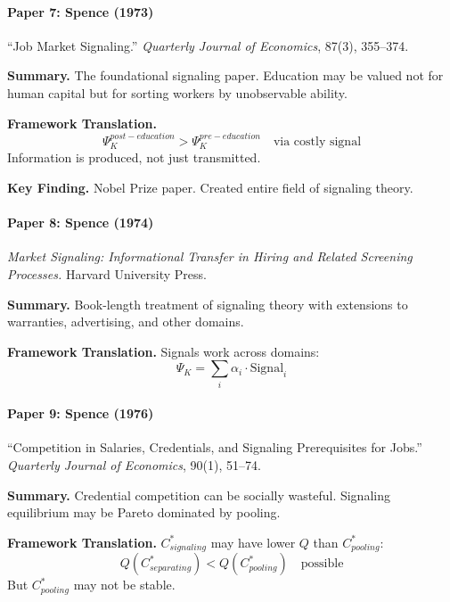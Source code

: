\paragraph{Paper 7: Spence (1973)}

``Job Market Signaling.''
\textit{Quarterly Journal of Economics}, 87(3), 355--374.

\textbf{Summary.}
The foundational signaling paper. Education may be valued not for human 
capital but for sorting workers by unobservable ability.

\textbf{Framework Translation.}
\begin{equation}
\Psi_K^{post-education} > \Psi_K^{pre-education} \quad \text{via costly signal}
\end{equation}
Information is produced, not just transmitted.

\textbf{Key Finding.}
Nobel Prize paper. Created entire field of signaling theory.

\paragraph{Paper 8: Spence (1974)}

\textit{Market Signaling: Informational Transfer in Hiring and Related 
Screening Processes.}
Harvard University Press.

\textbf{Summary.}
Book-length treatment of signaling theory with extensions to warranties, 
advertising, and other domains.

\textbf{Framework Translation.}
Signals work across domains:
\begin{equation}
\Psi_K = \sum_i \alpha_i \cdot \text{Signal}_i
\end{equation}

\paragraph{Paper 9: Spence (1976)}

``Competition in Salaries, Credentials, and Signaling Prerequisites for Jobs.''
\textit{Quarterly Journal of Economics}, 90(1), 51--74.

\textbf{Summary.}
Credential competition can be socially wasteful. Signaling equilibrium 
may be Pareto dominated by pooling.

\textbf{Framework Translation.}
$C^*_{signaling}$ may have lower $Q$ than $C^*_{pooling}$:
\begin{equation}
Q(C^*_{separating}) < Q(C^*_{pooling}) \quad \text{possible}
\end{equation}
But $C^*_{pooling}$ may not be stable.

